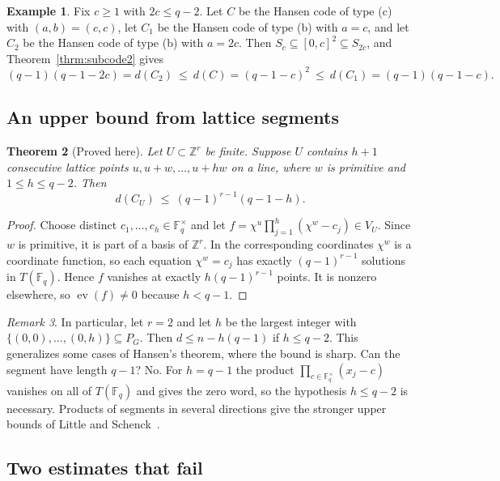 \documentclass[12pt,letterpaper]{article}
\numberwithin{equation}{section}
\newtheorem{theorem}{Theorem}[section]
\theoremstyle{definition}
\newtheorem{example}[theorem]{Example}
\theoremstyle{remark}
\newtheorem{remark}[theorem]{Remark}
\DeclareMathOperator{\ev}{ev}
\newcommand{\Z}{\mathbb{Z}}
\newcommand{\Fq}{\mathbb{F}_q}
\newcommand{\Fqs}{\mathbb{F}_q^{\times}}
\begin{document}
\begin{example}\label{ex:sandwich}
Fix $c\ge1$ with $2c\le q-2$. Let $C$ be the Hansen code of type (c) with
$(a,b)=(c,c)$, let $C_1$ be the Hansen code of type (b) with $a=c$, and let
$C_2$ be the Hansen code of type (b) with $a=2c$. Then
$S_c\subseteq[0,c]^2\subseteq S_{2c}$, and Theorem~\ref{thrm:subcode2} gives
\[
(q-1)(q-1-2c)=d(C_2)\ \le\ d(C)=(q-1-c)^2\ \le\ d(C_1)=(q-1)(q-1-c).
\]
\end{example}

\subsection{An upper bound from lattice segments}

\begin{theorem}[Proved here]\label{thm:segment}
Let $U\subset\Z^r$ be finite. Suppose $U$ contains $h+1$ consecutive lattice
points $u,u+w,\dots,u+hw$ on a line, where $w$ is primitive and $1\le h\le
q-2$. Then
\[
d(C_U)\ \le\ (q-1)^{r-1}(q-1-h).
\]
\end{theorem}

\begin{proof}
Choose distinct $c_1,\dots,c_h\in\Fqs$ and let
$f=\chi^u\prod_{j=1}^{h}(\chi^w-c_j)\in V_U$. Since $w$ is primitive, it is
part of a basis of $\Z^r$. In the corresponding coordinates $\chi^w$ is a
coordinate function, so each equation $\chi^w=c_j$ has exactly
$(q-1)^{r-1}$ solutions in $T(\Fq)$. Hence $f$ vanishes at exactly
$h(q-1)^{r-1}$ points. It is nonzero elsewhere, so $\ev(f)\ne0$ because $h<q-1$.
\end{proof}

\begin{remark}\label{rem:segment}
In particular, let $r=2$ and let $h$ be the largest integer with
$\{(0,0),\dots,(0,h)\}\subseteq P_G$. Then $d\le n-h(q-1)$ if $h\le q-2$. This
generalizes some cases of Hansen's theorem, where the bound is sharp. Can the
segment have length $q-1$? No. For $h=q-1$ the product $\prod_{c\in\Fqs}(x_j-c)$
vanishes on all of $T(\Fq)$ and gives the zero word, so the hypothesis $h\le
q-2$ is necessary. Products of segments in
several directions give the stronger upper bounds of Little and
Schenck~\cite{LS06}.
\end{remark}

\subsection{Two estimates that fail}\label{sec:fail}
\end{document}
